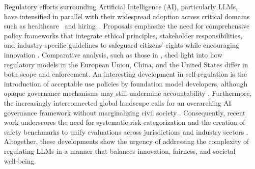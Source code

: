Regulatory efforts surrounding Artificial Intelligence (AI), particularly LLMs, have intensified in parallel with their widespread adoption across critical domains such as healthcare~\cite{mesko2023imperative} and hiring~\cite{jain2024ethical}. Proposals emphasize the need for comprehensive policy frameworks that integrate ethical principles, stakeholder responsibilities, and industry-specific guidelines to safeguard citizens' rights while encouraging innovation \cite{jain2024ethical}. Comparative analysis, such as those in \textcite{poncibo2025comparative}, shed light into how regulatory models in the European Union, China, and the United States differ in both scope and enforcement. An interesting development in self-regulation is the introduction of acceptable use policies by foundation model developers, although opaque governance mechanisms may still undermine accountability \cite{klyman2024acceptable}. Furthermore, the increasingly interconnected global landscape calls for an overarching AI governance framework without marginalizing civil society \cite{erman2024democratization}. Consequently, recent work underscores the need for systematic risk categorization and the creation of safety benchmarks to unify evaluations across jurisdictions and industry sectors \cite{zeng2024airiskcategorizationdecoded, zeng2024air}. Altogether, these developments show the urgency of addressing the complexity of regulating LLMs in a manner that balances innovation, fairness, and societal well-being.